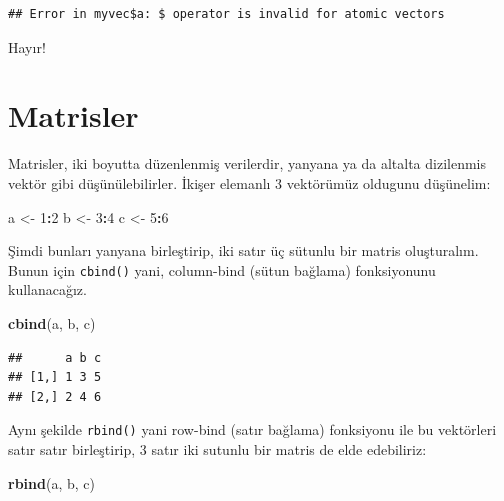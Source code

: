 \documentclass[
]{book}
\newenvironment{Shaded}{\begin{snugshade}}{\end{snugshade}}
\newcommand{\DecValTok}[1]{\textcolor[rgb]{0.00,0.00,0.81}{#1}}
\newcommand{\KeywordTok}[1]{\textcolor[rgb]{0.13,0.29,0.53}{\textbf{#1}}}
\newcommand{\NormalTok}[1]{#1}
\newcommand{\OperatorTok}[1]{\textcolor[rgb]{0.81,0.36,0.00}{\textbf{#1}}}
\newcommand{\StringTok}[1]{\textcolor[rgb]{0.31,0.60,0.02}{#1}}
\begin{document}
\begin{Shaded}
\end{Shaded}

\begin{verbatim}
## Error in myvec$a: $ operator is invalid for atomic vectors
\end{verbatim}

Hayır!

\hypertarget{matrisler}{%
\chapter{Matrisler}\label{matrisler}}

Matrisler, iki boyutta düzenlenmiş verilerdir, yanyana ya da altalta dizilenmis vektör gibi düşünülebilirler. İkişer elemanlı 3 vektörümüz oldugunu düşünelim:

\begin{Shaded}
\begin{Highlighting}[]
\NormalTok{a <{-}}\StringTok{ }\DecValTok{1}\OperatorTok{:}\DecValTok{2}
\NormalTok{b <{-}}\StringTok{ }\DecValTok{3}\OperatorTok{:}\DecValTok{4}
\NormalTok{c <{-}}\StringTok{ }\DecValTok{5}\OperatorTok{:}\DecValTok{6}
\end{Highlighting}
\end{Shaded}

Şimdi bunları yanyana birleştirip, iki satır üç sütunlu bir matris oluşturalım. Bunun için \texttt{cbind()} yani, column-bind (sütun bağlama) fonksiyonunu kullanacağız.

\begin{Shaded}
\begin{Highlighting}[]
\KeywordTok{cbind}\NormalTok{(a, b, c)}
\end{Highlighting}
\end{Shaded}

\begin{verbatim}
##      a b c
## [1,] 1 3 5
## [2,] 2 4 6
\end{verbatim}

Aynı şekilde \texttt{rbind()} yani row-bind (satır bağlama) fonksiyonu ile bu vektörleri satır satır birleştirip, 3 satır iki sutunlu bir matris de elde edebiliriz:

\begin{Shaded}
\begin{Highlighting}[]
\KeywordTok{rbind}\NormalTok{(a, b, c)}
\end{Highlighting}
\end{Shaded}
\end{document}
